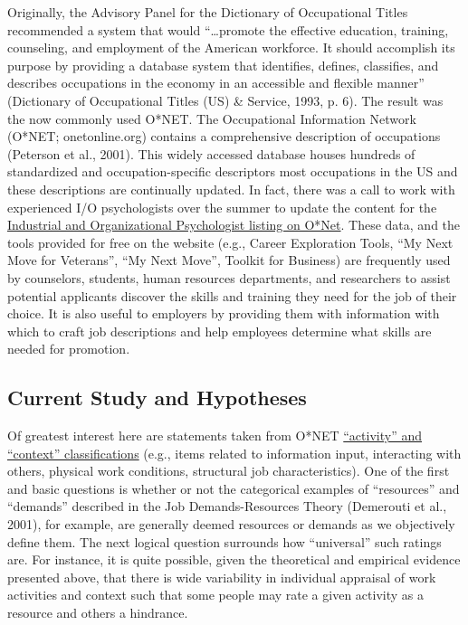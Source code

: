 \documentclass[
  man]{apa6}
\begin{document}
Originally, the Advisory Panel for the Dictionary of Occupational Titles recommended a system that would ``\ldots promote the effective education, training, counseling, and employment of the American workforce. It should accomplish its purpose by providing a database system that identifies, defines, classifies, and describes occupations in the economy in an accessible and flexible manner'' (Dictionary of Occupational Titles (US) \& Service, 1993, p. 6). The result was the now commonly used O*NET. The Occupational Information Network (O*NET; onetonline.org) contains a comprehensive description of occupations (Peterson et al., 2001). This widely accessed database houses hundreds of standardized and occupation-specific descriptors most occupations in the US and these descriptions are continually updated. In fact, there was a call to work with experienced I/O psychologists over the summer to update the content for the \href{https://www.onetonline.org/link/summary/19-3032.00}{Industrial and Organizational Psychologist listing on O*Net}. These data, and the tools provided for free on the website (e.g., Career Exploration Tools, ``My Next Move for Veterans'', ``My Next Move'', Toolkit for Business) are frequently used by counselors, students, human resources departments, and researchers to assist potential applicants discover the skills and training they need for the job of their choice. It is also useful to employers by providing them with information with which to craft job descriptions and help employees determine what skills are needed for promotion.

\hypertarget{current-study-and-hypotheses}{%
\subsection{Current Study and Hypotheses}\label{current-study-and-hypotheses}}

Of greatest interest here are statements taken from O*NET \href{https://www.O*NETonline.org/find/descriptor/result/4.A.1.b.3}{``activity'' and ``context'' classifications} (e.g., items related to information input, interacting with others, physical work conditions, structural job characteristics). One of the first and basic questions is whether or not the categorical examples of ``resources'' and ``demands'' described in the Job Demands-Resources Theory (Demerouti et al., 2001), for example, are generally deemed resources or demands as we objectively define them. The next logical question surrounds how ``universal'' such ratings are. For instance, it is quite possible, given the theoretical and empirical evidence presented above, that there is wide variability in individual appraisal of work activities and context such that some people may rate a given activity as a resource and others a hindrance.
\end{document}
